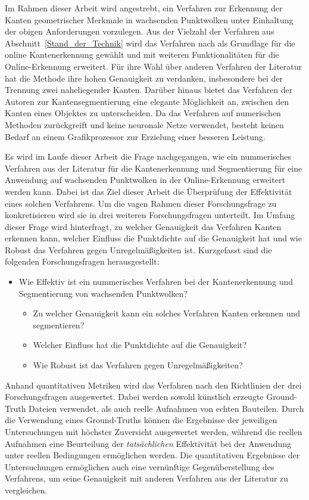 Im Rahmen dieser Arbeit wird angestrebt, ein Verfahren zur Erkennung der Kanten geometrischer Merkmale in wachsenden Punktwolken unter Einhaltung der obigen Anforderungen vorzulegen. Aus der Vielzahl der Verfahren aus Abschnitt~\ref{Stand_der_Technik} wird das Verfahren nach \textcite{ni_edge_2016} als Grundlage für die online Kantenerkennung gewählt und mit weiteren Funktionalitäten für die Online-Erkennung erweitert. Für ihre Wahl über anderen Verfahren der Literatur hat die Methode ihre hohen Genauigkeit zu verdanken, insbesondere bei der Trennung zwei naheliegender Kanten. Darüber hinaus bietet das Verfahren der Autoren zur Kantensegmentierung eine elegante Möglichkeit an, zwischen den Kanten eines Objektes zu unterscheiden. Da das Verfahren auf numerischen Methoden zurückgreift und keine neuronale Netze verwendet, besteht keinen Bedarf an einem Grafikprozessor zur Erzielung einer besseren Leistung. 

Es wird im Laufe dieser Arbeit die Frage nachgegangen, wie ein nummerisches Verfahren aus der Literatur für die Kantenerkennung und Segmentierung für eine Anwendung auf wachsenden Punktwolken in der Online-Erkennung erweitert werden kann. Dabei ist das Ziel dieser Arbeit die Überprüfung der Effektivität eines solchen Verfahrens. Um die vagen Rahmen dieser Forschungsfrage zu konkretisieren wird sie in drei weiteren Forschungsfragen unterteilt. Im Umfang dieser Frage wird hinterfragt, zu welcher Genauigkeit das Verfahren Kanten erkennen kann, welcher Einfluss die Punktdichte auf die Genauigkeit hat und wie Robust das Verfahren gegen Unregelmäßigkeiten ist. Kurzgefasst sind die folgenden Forschungsfragen herausgestellt:

\begin{itemize}
	\item Wie Effektiv ist ein nummerisches Verfahren bei der Kantenerkennung und Segmentierung von wachsenden Punktwolken?
	\begin{itemize}
		\item Zu welcher Genauigkeit kann ein solches Verfahren Kanten erkennen und segmentieren?
		\item Welcher Einfluss hat die Punktdichte auf die Genauigkeit?
		\item Wie Robust ist das Verfahren gegen Unregelmäßigkeiten?
	\end{itemize}
\end{itemize}

Anhand quantitativen Metriken wird das Verfahren nach den Richtlinien der drei Forschungsfragen ausgewertet. Dabei werden sowohl künstlich erzeugte Ground-Truth Dateien verwendet, als auch reelle Aufnahmen von echten Bauteilen. Durch die Verwendung eines Ground-Truths können die Ergebnisse der jeweiligen Untersuchungen mit höchster Zuversicht ausgewertet werden, während die reellen Aufnahmen eine Beurteilung der \textit{tatsächlichen} Effektivität bei der Anwendung unter reellen Bedingungen ermöglichen werden. Die quantitativen Ergebnisse der Untersuchungen ermöglichen auch eine vernünftige Gegenüberstellung des Verfahrens, um seine Genauigkeit mit anderen Verfahren aus der Literatur zu vergleichen. 

